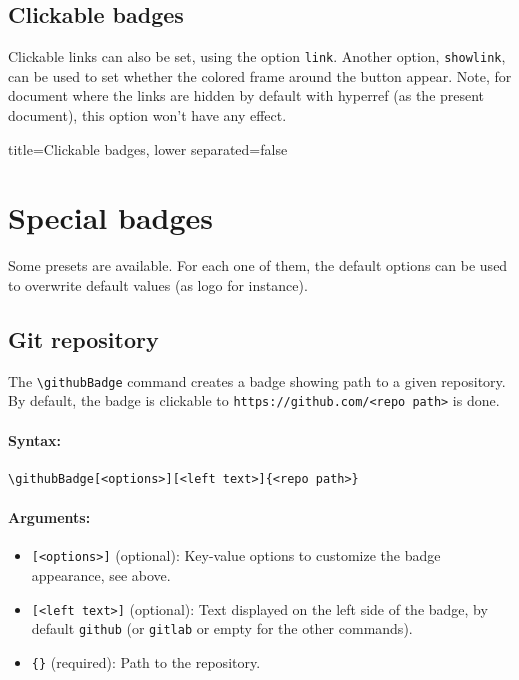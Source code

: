 \subsection{Clickable badges}


Clickable links can also be set, using the option \texttt{link}.
Another option, \texttt{showlink}, can be used to set whether the colored frame around the button appear.
Note, for document where the links are hidden by default with \textsf{hyperref} (as the present document), this option won't have any effect.

\begin{tcblisting}{title={Clickable badges}, lower separated=false}
\end{tcblisting}



\section{Special badges}
\label{sec:special-badges}


Some presets are available.
For each one of them, the default options can be used to overwrite default values (as logo for instance).

\subsection{Git repository}

The \texttt{\textbackslash githubBadge} command creates a badge showing path to a given repository.
By default, the badge is clickable to \texttt{https://github.com/<repo path>} is done.


\paragraph{Syntax:}
\begin{verbatim}
\githubBadge[<options>][<left text>]{<repo path>}
\end{verbatim}

\paragraph{Arguments:}
\begin{itemize}
    \item \texttt{[<options>]} (optional): Key-value options to customize the badge appearance, see above.
    \item \texttt{[<left text>]} (optional): Text displayed on the left side of the badge, by default \texttt{github} (or \texttt{gitlab} or empty for the other commands).
    \item \texttt{\{<repo path>\}} (required): Path to the repository.
\end{itemize}


